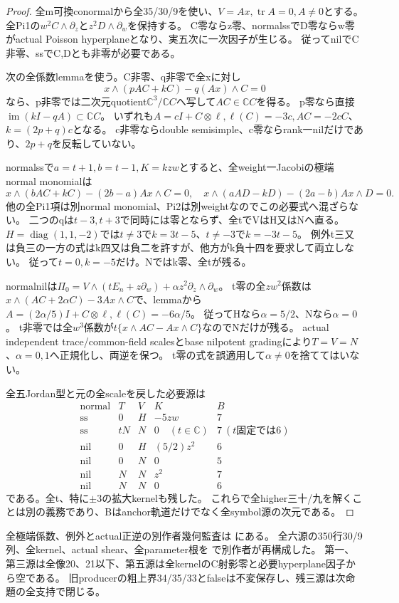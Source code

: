 \documentclass[a4paper,11pt]{ltjsarticle}
\theoremstyle{definition}
\begin{document}
\begin{proof}
全m可換conormalから全35/30/9を使い、$V=Ax,\operatorname{tr}A=0,A\ne0$とする。
全Pi1の$w^2C\wedge\partial_z$と$z^2D\wedge\partial_w$を保持する。
C零ならz零、normalssでD零ならw零がactual Poisson hyperplaneとなり、実五次に一次因子が生じる。
従ってnilでC非零、ssでC,Dとも非零が必要である。

次の全係数lemmaを使う。C非零、q非零で全xに対し
\[
 x\wedge(pAC+kC)-q(Ax)\wedge C=0
\]
なら、p非零では二次元quotient$\mathbb C^3/\mathbb CC$へ写して$AC\in\mathbb CC$を得る。
p零なら直接$\operatorname{im}(kI-qA)\subset\mathbb CC$。
いずれも$A=cI+C\otimes\ell,\ell(C)=-3c,AC=-2cC$、$k=(2p+q)c$となる。
c非零ならdouble semisimple、c零ならrank一nilだけであり、$2p+q$を反転していない。

normalssで$a=t+1,b=t-1,K=kzw$とすると、全weight一Jacobiの極端normal monomialは
\[
 x\wedge(bAC+kC)-(2b-a)Ax\wedge C=0,
 \quad x\wedge(aAD-kD)-(2a-b)Ax\wedge D=0.
\]
他の全Pi1項は別normal monomial、Pi2は別weightなのでこの必要式へ混ざらない。
二つのqは$t-3,t+3$で同時には零とならず、全tでVはH又はNへ直る。
$H=\operatorname{diag}(1,1,-2)$では$t\ne3$で$k=3t-5$、$t\ne-3$で$k=-3t-5$。
例外t三又は負三の一方の式はk四又は負二を許すが、他方がk負十四を要求して両立しない。
従って$t=0,k=-5$だけ。Nではk零、全tが残る。

normalnilは$\Pi_0=V\wedge(tE_n+z\partial_w)+\alpha z^2\partial_z\wedge\partial_w$。
t零の全$zw^2$係数は
$x\wedge(AC+2\alpha C)-3Ax\wedge C$で、lemmaから
$A=(2\alpha/5)I+C\otimes\ell,\ell(C)=-6\alpha/5$。
従ってHなら$\alpha=5/2$、Nなら$\alpha=0$。
t非零では全$w^3$係数が$t\{x\wedge AC-Ax\wedge C\}$なのでNだけが残る。
actual independent trace/common-field scalesとbase nilpotent gradingにより$T=V=N$、$\alpha=0,1$へ正規化し、両逆を保つ。
t零の式を誤適用して$\alpha\ne0$を捨ててはいない。

全五Jordan型と元の全scaleを戻した必要源は
\[
\begin{array}{c|c|c|c|c}
 \text{normal}&T&V&K&B\\\hline
 \mathrm{ss}&0&H&-5zw&7\\
 \mathrm{ss}&tN&N&0\quad(t\in\mathbb C)&7\ (t\text{固定では}6)\\
 \mathrm{nil}&0&H&(5/2)z^2&6\\
 \mathrm{nil}&0&N&0&5\\
 \mathrm{nil}&N&N&z^2&7\\
 \mathrm{nil}&N&N&0&6
\end{array}
\]
である。全t、特に$\pm3$の拡大kernelも残した。
これらで全higher三十/九を解くことは別の義務であり、Bはanchor軌道だけでなく全symbol源の次元である。
\end{proof}
全極端係数、例外とactual正逆の別作者幾何監査は
にある。
全六源の350行30/9列、全kernel、actual shear、全parameter根を
で別作者が再構成した。
第一、第三源は全像20、21以下、第五源は全kernelのC射影零と必要hyperplane因子から空である。
旧producerの粗上界34/35/33とfalseは不変保存し、残三源は次命題の全支持で閉じる。
\end{document}
